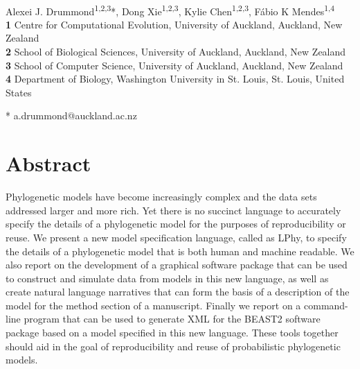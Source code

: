 \documentclass[10pt,letterpaper,table]{article}
\begin{document}
\vspace*{0.2in}

\begin{flushleft}
{\Large
\textbf{} %
}
\newline
\\
Alexei J. Drummond\textsuperscript{1,2,3}*,
Dong Xie\textsuperscript{1,2,3},
Kylie Chen\textsuperscript{1,2,3},
F\'{a}bio K Mendes\textsuperscript{1,4}
\\
\bigskip
\textbf{1} Centre for Computational Evolution, University of Auckland, Auckland, New Zealand
\\
\textbf{2} School of Biological Sciences, University of Auckland, Auckland, New Zealand
\\
\textbf{3} School of Computer Science, University of Auckland, Auckland, New Zealand
\\
\textbf{4} Department of Biology, Washington University in St. Louis, St. Louis, United States
\\
\bigskip

% 
%

* a.drummond@auckland.ac.nz

\end{flushleft}
\section*{Abstract}
  Phylogenetic models have become increasingly complex and the data sets addressed larger and more rich.
  Yet there is no succinct language to accurately specify the details of a phylogenetic model for the purposes of reproducibility or reuse.
  We present a new model specification language, called as LPhy, to specify the details of a phylogenetic model that is both human and machine readable.
  We also report on the development of a graphical software package that can be used to construct and simulate data from
  models in this new language, as well as create natural language narratives that can form the basis of a description of the model for the method section of a manuscript.
  Finally we report on a command-line program that can be used to generate XML for the BEAST2 software package based
  on a model specified in this new language.
  These tools together should aid in the goal of reproducibility and reuse of probabilistic phylogenetic models.
\end{document}
